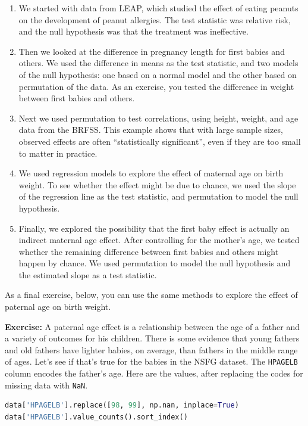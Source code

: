 \begin{enumerate}
\def\labelenumi{\arabic{enumi}.}
\item
  We started with data from LEAP, which studied the effect of eating
  peanuts on the development of peanut allergies. The test statistic was
  relative risk, and the null hypothesis was that the treatment was
  ineffective.
\item
  Then we looked at the difference in pregnancy length for first babies
  and others. We used the difference in means as the test statistic, and
  two models of the null hypothesis: one based on a normal model and the
  other based on permutation of the data. As an exercise, you tested the
  difference in weight between first babies and others.
\item
  Next we used permutation to test correlations, using height, weight,
  and age data from the BRFSS. This example shows that with large sample
  sizes, observed effects are often ``statistically significant'', even
  if they are too small to matter in practice.
\item
  We used regression models to explore the effect of maternal age on
  birth weight. To see whether the effect might be due to chance, we
  used the slope of the regression line as the test statistic, and
  permutation to model the null hypothesis.
\item
  Finally, we explored the possibility that the first baby effect is
  actually an indirect maternal age effect. After controlling for the
  mother's age, we tested whether the remaining difference between first
  babies and others might happen by chance. We used permutation to model
  the null hypothesis and the estimated slope as a test statistic.
\end{enumerate}

As a final exercise, below, you can use the same methods to explore the
effect of paternal age on birth weight.

\textbf{Exercise:} A paternal age effect is a relationship between the
age of a father and a variety of outcomes for his children. There is
some evidence that young fathers and old fathers have lighter babies, on
average, than fathers in the middle range of ages. Let's see if that's
true for the babies in the NSFG dataset. The
\passthrough{\lstinline!HPAGELB!} column encodes the father's age. Here
are the values, after replacing the codes for missing data with
\passthrough{\lstinline!NaN!}.

\begin{lstlisting}[language=Python,style=source]
data['HPAGELB'].replace([98, 99], np.nan, inplace=True)
data['HPAGELB'].value_counts().sort_index()
\end{lstlisting}

